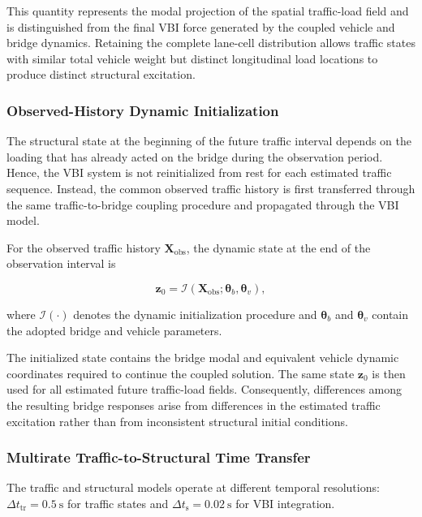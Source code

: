 \documentclass[journal]{IEEEtran}
\begin{document}
This quantity represents the modal projection of the spatial traffic-load field and is distinguished from the final VBI force generated by the coupled vehicle and bridge dynamics. Retaining the complete lane-cell distribution allows traffic states with similar total vehicle weight but distinct longitudinal load locations to produce distinct structural excitation.




\subsubsection{Observed-History Dynamic Initialization}

The structural state at the beginning of the future traffic interval depends on the loading that has already acted on the bridge during the observation period. Hence, the VBI system is not reinitialized from rest for each estimated traffic sequence. Instead, the common observed traffic history is first transferred through the same traffic-to-bridge coupling procedure and propagated through the VBI model.

For the observed traffic history $\mathbf{X}_{\mathrm{obs}}$, the dynamic state at the end of the observation interval is

\begin{equation}
\mathbf{z}_{0}
=
\mathcal{I}
\left(
\mathbf{X}_{\mathrm{obs}};
\boldsymbol{\theta}_{b},
\boldsymbol{\theta}_{v}
\right),
\end{equation}

where $\mathcal{I}(\cdot)$ denotes the dynamic initialization procedure and $\boldsymbol{\theta}_{b}$ and $\boldsymbol{\theta}_{v}$ contain the adopted bridge and vehicle parameters.

The initialized state contains the bridge modal and equivalent vehicle dynamic coordinates required to continue the coupled solution. The same state $\mathbf{z}_{0}$ is then used for all estimated future traffic-load fields. Consequently, differences among the resulting bridge responses arise from differences in the estimated traffic excitation rather than from inconsistent structural initial conditions.



\subsubsection{Multirate Traffic-to-Structural Time Transfer}

The traffic and structural models operate at different temporal resolutions: $\Delta t_{\mathrm{tr}}=0.5~\mathrm{s}$ for traffic states and $\Delta t_{\mathrm{s}}=0.02~\mathrm{s}$ for VBI integration.
\end{document}
